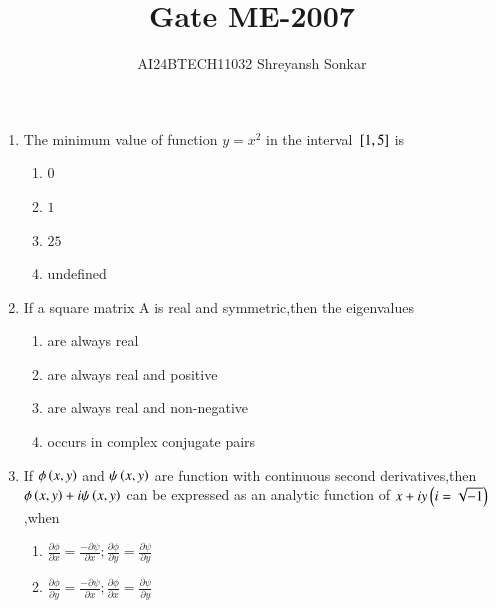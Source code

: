 \documentclass[journal]{IEEEtran}
\begin{document}

\vspace{3cm}


\renewcommand{\thefigure}{\theenumi}
\renewcommand{\thetable}{\theenumi}
\setlength{\intextsep}{10pt} %


\renewcommand{\thetable}{\theenumi}

\title{Gate ME-2007}
\author{AI24BTECH11032 Shreyansh Sonkar
}
\maketitle
\renewcommand{\thefigure}{\theenumi}
\renewcommand{\thetable}{\theenumi}
\begin{enumerate}
\item The minimum  value of function $y=x^{2}$ in the interval ${}\left[1,5\right]$ is 
\begin{multicols}{4}
    \begin{enumerate}
        \item $0$
        \item $1$
        \item $25$
        \item undefined
    \end{enumerate}
\end{multicols}
\bigskip
\item If a square matrix A is real and symmetric,then the eigenvalues 
\begin{enumerate}
        \item are always real
        \item are always real and positive 
        \item are always real and non-negative
        \item occurs in complex conjugate pairs
 \end{enumerate}
\bigskip
\item If $\phi\left(x,y\right)$ and $\psi\left(x,y\right)$ are function with continuous  second derivatives,then$\phi\left(x,y\right)+i\psi\left(x,y\right)$ can be expressed as an analytic function of $x+iy\left(i=\sqrt{-1}\right)$,when
\begin{enumerate}
        \item $\frac{\partial\phi}{\partial x}=\frac{-\partial\psi}{\partial x};\frac{\partial\phi}{\partial y}=\frac{\partial\psi}{\partial y}$
        \item $\frac{\partial\phi}{\partial y}=\frac{-\partial\psi}{\partial x};\frac{\partial\phi}{\partial x}=\frac{\partial\psi}{\partial y}$

\end{enumerate}
\end{enumerate}
\end{document}

